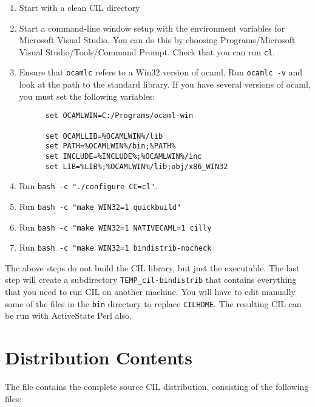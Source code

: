 \documentclass{article}
\def\t#1{{\tt #1}}
\begin{document}
\begin{enumerate}
\item Start with a clean CIL directory
\item Start a command-line window setup with the environment variables for
  Microsoft Visual Studio. You can do this by choosing Programs/Microsoft
  Visual Studio/Tools/Command Prompt. Check that you can run \t{cl}. 
\item Ensure that \t{ocamlc} refers to a Win32 version of ocaml. Run \t{ocamlc
  -v} and look at the path to the standard library. If you have several
  versions of ocaml, you must set the following variables:
   \begin{verbatim}
      set OCAMLWIN=C:/Programs/ocaml-win

      set OCAMLLIB=%OCAMLWIN%/lib
      set PATH=%OCAMLWIN%/bin;%PATH%
      set INCLUDE=%INCLUDE%;%OCAMLWIN%/inc
      set LIB=%LIB%;%OCAMLWIN%/lib;obj/x86_WIN32
   \end{verbatim}

\item Run \t{bash -c "./configure CC=cl"}.
\item Run \t{bash -c "make WIN32=1 quickbuild"}
\item Run \t{bash -c "make WIN32=1 NATIVECAML=1 cilly}
\item Run \t{bash -c "make WIN32=1 bindistrib-nocheck}
\end{enumerate}

 The above steps do not build the CIL library, but just the executable. The
last step will create a subdirectory \t{TEMP\_cil-bindistrib} that contains
everything that you need to run CIL on another machine. You will have to edit
manually some of the files in the \t{bin} directory to replace \t{CILHOME}.
The resulting CIL can be run with ActiveState Perl also. 


  \section{Distribution Contents}

The file  
contains the complete source CIL distribution, 
consisting of the following files:
\end{document}
